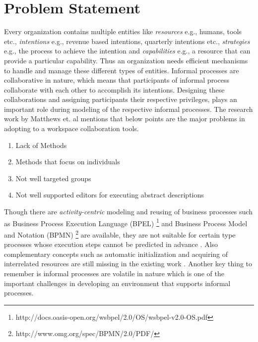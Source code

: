 \section{Problem Statement}
\label{sec:problemstatement}
 Every organization contains multiple entities like \textit{resources} e.g., humans, tools etc., \textit{intentions} e.g., revenue based intentions, quarterly intentions etc., \textit{strategies} e.g., the process to achieve the intention and \textit{capabilities} e.g., a resource that can provide a particular capability. Thus an organization needs efficient mechanisms to handle and manage these different types of entities. Informal processes are collaborative in nature, which means that participants of informal process collaborate with each other to accomplish its intentions\cite{Sungur2015}. Designing these collaborations and assigning participants their respective privileges, plays an important role during modeling of the respective informal processes. The research work by Matthews et. al \cite{Matthews2011} mentions that below points are the major problems in adopting to a workspace collaboration tools.

\begin{enumerate}
	\item Lack of Methods
	\item Methods that focus on individuals
	\item Not well targeted groups
	\item Not well supported editors for executing abstract descriptions
\end{enumerate}

Though there are \textit{activity-centric} modeling and reusing of business processes such as Business Process Execution Language (BPEL) \footnote{http://docs.oasis-open.org/wsbpel/2.0/OS/wsbpel-v2.0-OS.pdf} and Business Process Model and Notation (BPMN) \footnote{http://www.omg.org/spec/BPMN/2.0/PDF/} are available, they are not suitable for certain type processes whose execution steps cannot be predicted in advance \cite{Sungur2014a}. Also complementary concepts such as automatic initialization and acquiring of interrelated resources are still missing in the existing work \cite{Sungur2015}. Another key thing to remember is informal processes are volatile in nature which is one of the important challenges in developing an environment that supports informal processes.

